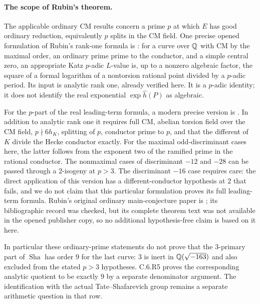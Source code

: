 \paragraph{The scope of Rubin's theorem.}
The applicable ordinary CM results concern a prime $p$ at which
$E$ has good ordinary reduction, equivalently $p$ splits in the CM
field. One precise opened formulation of Rubin's rank-one formula
is \citet[Theorem 1]{CrBDP2012}: for a curve over $\mathbb Q$ with CM
by the maximal order, an ordinary prime prime to the conductor,
and a simple central zero, an appropriate Katz $p$-adic $L$-value
is, up to a nonzero algebraic factor, the square of a formal
logarithm of a nontorsion rational point divided by a $p$-adic
period. Its input is analytic rank one, already verified here.
It is a $p$-adic identity; it does not identify the real exponential
$\exp\widehat h(P)$ as algebraic.

For the $p$-part of the real leading-term formula, a modern precise
version is \citet[Theorem A]{CrCastella2025}. In addition to analytic
rank one it requires full CM, abelian torsion field over the CM
field, $p\nmid6h_K$, splitting of $p$, conductor prime to $p$,
and that the different of $K$ divide the Hecke conductor exactly.
For the maximal odd-discriminant cases here, the latter follows
from the exponent two of the ramified prime in the rational
conductor. The nonmaximal cases of discriminant $-12$ and $-28$
can be passed through a $2$-isogeny at $p>3$. The discriminant
$-16$ case requires care: the direct application of this version
has a different-conductor hypothesis at $2$ that fails, and we
do not claim that this particular formulation proves its full
leading-term formula. Rubin's original ordinary main-conjecture
paper is \citep{CrRubin1991}; its bibliographic record was checked,
but its complete theorem text was not available in the opened
publisher copy, so no additional hypothesis-free claim is based
on it here.

In particular these ordinary-prime statements do not prove that
the $3$-primary part of $\operatorname{Sha}$ has order $9$ for the
last curve: $3$ is inert in $\mathbb Q(\sqrt{-163})$ and also excluded
from the stated $p>3$ hypotheses. C.6.R5 proves the corresponding
analytic quotient to be exactly $9$ by a separate denominator
argument. The identification with the actual Tate--Shafarevich
group remains a separate arithmetic question in that row.
